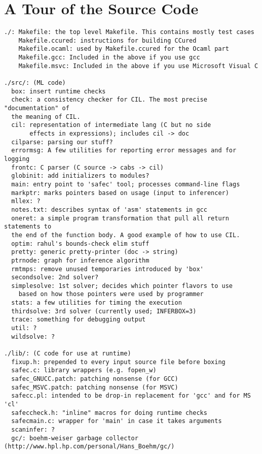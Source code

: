 \documentclass{book}
\begin{document}
\chapter{A Tour of the Source Code}
\begin{verbatim}
./: Makefile: the top level Makefile. This contains mostly test cases
    Makefile.ccured: instructions for building CCured
    Makefile.ocaml: used by Makefile.ccured for the Ocaml part
    Makefile.gcc: Included in the above if you use gcc
    Makefile.msvc: Included in the above if you use Microsoft Visual C

./src/: (ML code)
  box: insert runtime checks
  check: a consistency checker for CIL. The most precise "documentation" of
  the meaning of CIL.
  cil: representation of intermediate lang (C but no side
       effects in expressions); includes cil -> doc
  cilparse: parsing our stuff?
  errormsg: A few utilities for reporting error messages and for logging
  frontc: C parser (C source -> cabs -> cil)
  globinit: add initializers to modules?
  main: entry point to 'safec' tool; processes command-line flags
  markptr: marks pointers based on usage (input to inferencer)
  mllex: ?
  notes.txt: describes syntax of 'asm' statements in gcc
  oneret: a simple program transformation that pull all return statements to
  the end of the function body. A good example of how to use CIL.
  optim: rahul's bounds-check elim stuff
  pretty: generic pretty-printer (doc -> string)
  ptrnode: graph for inference algorithm
  rmtmps: remove unused temporaries introduced by 'box'
  secondsolve: 2nd solver?
  simplesolve: 1st solver; decides which pointer flavors to use
    based on how those pointers were used by programmer
  stats: a few utilities for timing the execution
  thirdsolve: 3rd solver (currently used; INFERBOX=3)
  trace: something for debugging output
  util: ?
  wildsolve: ?

./lib/: (C code for use at runtime)
  fixup.h: prepended to every input source file before boxing
  safec.c: library wrappers (e.g. fopen_w)
  safec_GNUCC.patch: patching nonsense (for GCC)
  safec_MSVC.patch: patching nonsense (for MSVC)
  safecc.pl: intended to be drop-in replacement for 'gcc' and for MS 'cl'
  safeccheck.h: "inline" macros for doing runtime checks
  safecmain.c: wrapper for 'main' in case it takes arguments
  scaninfer: ?
  gc/: boehm-weiser garbage collector (http://www.hpl.hp.com/personal/Hans_Boehm/gc/)
\end{verbatim}

 
\end{document}
